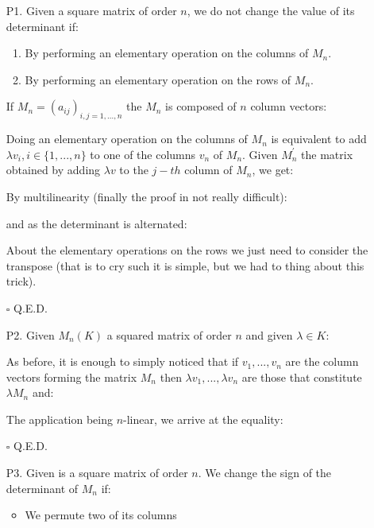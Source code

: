	\begin{enumerate}
		\item[P1.] Given a square matrix of order $n$, we do not change the value of its determinant if:
		\begin{enumerate}
			\item By performing an elementary operation on the columns of $M_n$.

			\item By performing an elementary operation on the rows of $M_n$.
		\end{enumerate}
		\begin{dem}
		If $M_n=(a_{ij})_{i,j=1,...,n}$ the $M_n$ is composed of $n$ column vectors:
		
		Doing an elementary operation on the columns of $M_n$ is equivalent to add $\lambda v_i,i \in \{1,...,n\}$ to one of the columns $v_n$ of $M_n$. Given $M_n^{'}$ the matrix obtained by adding $\lambda v$ to the $j-th$ column of $M_n$, we get:
		
		By multilinearity (finally the proof in not really difficult):
		
		and as the determinant is alternated:
		
		About the elementary operations on the rows we just need to consider the transpose (that is to cry such it is simple, but we had to thing about this trick).
		\begin{flushright}
			$\square$  Q.E.D.
		\end{flushright}
		\end{dem}
		
		\item[P2.] Given $M_n(K)$ a squared matrix of order $n$ and given $\lambda \in K$:
		
		\begin{dem}
		As before, it is enough to simply noticed that if $v_1,...,v_n$ are the column vectors forming the matrix $M_n$ then $\lambda v_1,...,\lambda v_n$ are those that constitute $\lambda M_n$ and:
		
		The application being $n$-linear, we arrive at the equality:
		
		\begin{flushright}
			$\square$  Q.E.D.
		\end{flushright}
		\end{dem}
		
		\item[P3.] Given is a square matrix of order $n$. We change the sign of the determinant of $M_n$ if:
		\begin{itemize}
			\item We permute two of its columns
	

\end{itemize}
\end{enumerate}
